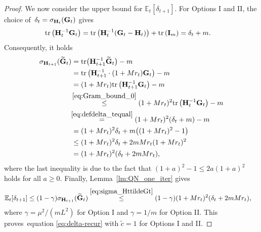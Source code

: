 \documentclass[11pt]{article}
\theoremstyle{plain}
\theoremstyle{definition}
\theoremstyle{remark}
\theoremstyle{plain}
\def\vzero{{\bf{0}}}
\def\G{{\bf G}}
\def\H{{\bf H}}
\def\I{{\bf I}}
\def \tr #1{\text{\rm tr}\left(#1\right)}
\begin{document}
\begin{proof}
We now consider the upper bound for $\mathbb E_t[\delta_{t+1}]$.
For Options I and II, the choice of~$\delta_t=\sigma_{\H_t}(\G_t)$ gives
\begin{align}
\label{eq:defdelta_tequal}
    \tr{\H_t^{-1}\G_t}
&=\tr{\H_t^{-1}(\G_t-\H_t)}+\tr{\I_m}
=\delta_t+m.
\end{align}
Consequently, it holds
\begin{align}
    \label{eq:sigma_HttildeGt}
    \begin{split}
\sigma_{\H_{t+1}}(\widetilde{\G}_t)
&={\rm tr}\big(\H_{t+1}^{-1}\widetilde{\G}_t\big)-m\\
&=\tr{\H_{t+1}^{-1}\cdot(1+Mr_t)\G_t}-m\\
&=(1+Mr_t)\tr{\H_{t+1}^{-1}\G_t}-m\\
&\!\overset{\eqref{eq:Gram_bound_0}}{\leq}
(1+Mr_t)^2\tr{\H_t^{-1}\G_t}-m\\
&\!\!\overset{\eqref{eq:defdelta_tequal}}{=}(1+Mr_t)^2(\delta_t+m)-m\\
&=(1+Mr_t)^2\delta_t
  +m\bigl((1+Mr_t)^2-1\bigr)\\
&\leq(1+Mr_t)^2\delta_t
  +2mMr_t(1+Mr_t)^2\\
&=(1+Mr_t)^2(\delta_t+2mMr_t),
    \end{split}
\end{align}
where the last inequality is due to the fact that $(1+a)^2-1\leq2a(1+a)^2$ holds for all $a\geq 0$.
Finally, Lemma~\ref{lm:QN_one_iter} gives
\begin{align*}
\mathbb E_t[\delta_{t+1}]
&\leq(1-\gamma)\sigma_{\H_{t+1}}(\widetilde{\G}_t)\overset{\eqref{eq:sigma_HttildeGt}}{\leq} (1-\gamma)(1+Mr_t)^2(\delta_t+2mMr_t),
\end{align*}
where $\gamma=\mu^2/(mL^2)$ for Option I and 
$\gamma=1/m$ for Option II.
This proves~equation \eqref{eq:delta-recur} with $\tilde c=1$ for Options I and II.


\end{proof}
\end{document}
